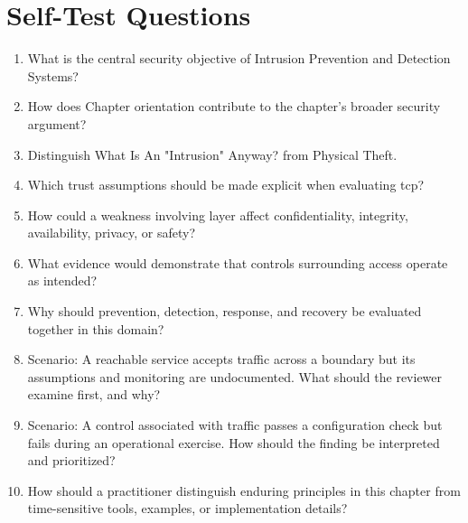 \documentclass[11pt]{article}
\begin{document}
\section*{Self-Test Questions}
\begin{enumerate}
\item What is the central security objective of Intrusion Prevention and Detection Systems?
\item How does Chapter orientation contribute to the chapter's broader security argument?
\item Distinguish What Is An "Intrusion" Anyway? from Physical Theft.
\item Which trust assumptions should be made explicit when evaluating tcp?
\item How could a weakness involving layer affect confidentiality, integrity, availability, privacy, or safety?
\item What evidence would demonstrate that controls surrounding access operate as intended?
\item Why should prevention, detection, response, and recovery be evaluated together in this domain?
\item Scenario: A reachable service accepts traffic across a boundary but its assumptions and monitoring are undocumented. What should the reviewer examine first, and why?
\item Scenario: A control associated with traffic passes a configuration check but fails during an operational exercise. How should the finding be interpreted and prioritized?
\item How should a practitioner distinguish enduring principles in this chapter from time-sensitive tools, examples, or implementation details?
\end{enumerate}
\end{document}
